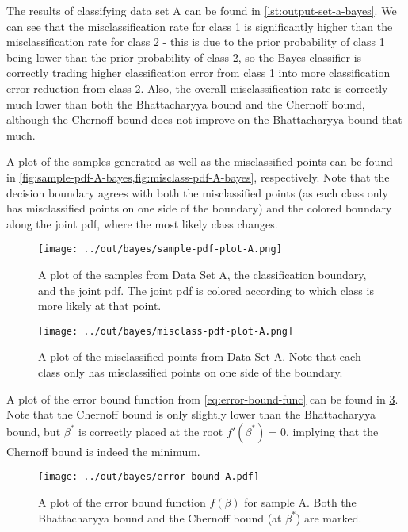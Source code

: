\documentclass[headings=optiontoheadandtoc,listof=totoc,parskip=full]{scrartcl}
\begin{document}
The results of classifying data set A can be found in \cref{lst:output-set-a-bayes}. We can see that the misclassification rate for class 1 is significantly higher than the misclassification rate for class 2 - this is due to the prior probability of class 1 being lower than the prior probability of class 2, so the Bayes classifier is correctly trading higher classification error from class 1 into more classification error reduction from class 2. Also, the overall misclassification rate is correctly much lower than both the Bhattacharyya bound and the Chernoff bound, although the Chernoff bound does not improve on the Bhattacharyya bound that much.



A plot of the samples generated as well as the misclassified points can be found in \cref{fig:sample-pdf-A-bayes,fig:misclass-pdf-A-bayes}, respectively. Note that the decision boundary agrees with both the misclassified points (as each class only has misclassified points on one side of the boundary) and the colored boundary along the joint pdf, where the most likely class changes.

\begin{figure}[H]
	\centering
	\texttt{[image: ../out/bayes/sample-pdf-plot-A.png]}
	\caption{A plot of the samples from Data Set A, the classification boundary, and the joint pdf. The joint pdf is colored according to which class is more likely at that point.}
	\label{fig:sample-pdf-A-bayes}
\end{figure}


\begin{figure}[H]
	\centering
	\texttt{[image: ../out/bayes/misclass-pdf-plot-A.png]}
	\caption{A plot of the misclassified points from Data Set A. Note that each class only has misclassified points on one side of the boundary.}
	\label{fig:misclass-pdf-A-bayes}
\end{figure}

A plot of the error bound function from \cref{eq:error-bound-func} can be found in \cref{fig:error-bound-A}. Note that the Chernoff bound is only slightly lower than the Bhattacharyya bound, but $\beta^*$ is correctly placed at the root $f'(\beta^*) = 0$, implying that the Chernoff bound is indeed the minimum.

\begin{figure}[H]
	\centering
	\texttt{[image: ../out/bayes/error-bound-A.pdf]}
	\caption{A plot of the error bound function $f(\beta)$ for sample A. Both the Bhattacharyya bound and the Chernoff bound (at $\beta^*$) are marked.}
	\label{fig:error-bound-A}
\end{figure}
\end{document}
